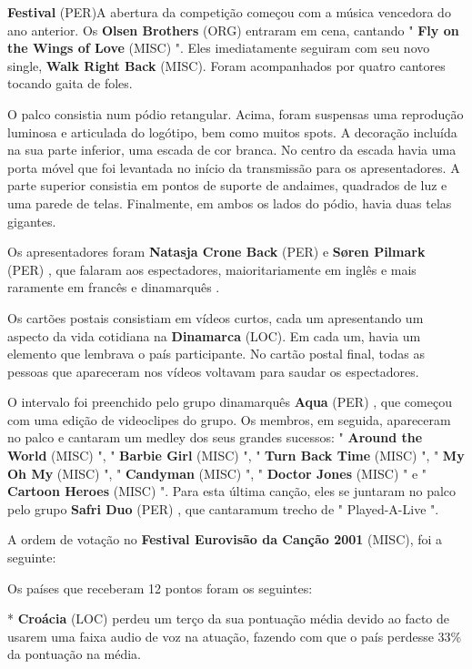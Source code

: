 \documentclass[12pt,a4paper]{article}
\begin{document}
\textbf{Festival} (PER)A abertura da competição começou com a música vencedora do ano anterior. Os \textbf{Olsen Brothers} (ORG) entraram em cena, cantando " \textbf{Fly on the Wings of Love} (MISC) ". Eles imediatamente seguiram com seu novo single, \textbf{Walk Right Back} (MISC). Foram acompanhados por quatro cantores tocando gaita de foles.

O palco consistia num pódio retangular. Acima, foram suspensas uma reprodução luminosa e articulada do logótipo, bem como muitos spots. A decoração incluída na sua parte inferior, uma escada de cor branca. No centro da escada havia uma porta móvel que foi levantada no início da transmissão para os apresentadores. A parte superior consistia em pontos de suporte de andaimes, quadrados de luz e uma parede de telas. Finalmente, em ambos os lados do pódio, havia duas telas gigantes.

Os apresentadores foram \textbf{Natasja Crone Back} (PER) e \textbf{Søren Pilmark} (PER) , que falaram aos espectadores, maioritariamente em inglês e mais raramente em francês e dinamarquês .

Os cartões postais consistiam em vídeos curtos, cada um apresentando um aspecto da vida cotidiana na \textbf{Dinamarca} (LOC). Em cada um, havia um elemento que lembrava o país participante. No cartão postal final, todas as pessoas que apareceram nos vídeos voltavam para saudar os espectadores.

O intervalo foi preenchido pelo grupo dinamarquês \textbf{Aqua} (PER) , que começou com uma edição de videoclipes do grupo. Os membros, em seguida, apareceram no palco e cantaram um medley dos seus grandes sucessos: " \textbf{Around the World} (MISC) ", " \textbf{Barbie Girl} (MISC) ", " \textbf{Turn Back Time} (MISC) ", " \textbf{My Oh My} (MISC) ", " \textbf{Candyman} (MISC) ", " \textbf{Doctor Jones} (MISC) " e " \textbf{Cartoon Heroes} (MISC) ". Para esta última canção, eles se juntaram no palco pelo grupo \textbf{Safri Duo} (PER) , que cantaramum trecho de " Played-A-Live ".

A ordem de votação no \textbf{Festival Eurovisão da Canção 2001} (MISC), foi a seguinte:

Os países que receberam 12 pontos foram os seguintes:

* \textbf{Croácia} (LOC) perdeu um terço da sua pontuação média devido ao facto de usarem uma faixa audio de voz na atuação, fazendo com que o país perdesse 33\% da pontuação na média.
\end{document}
